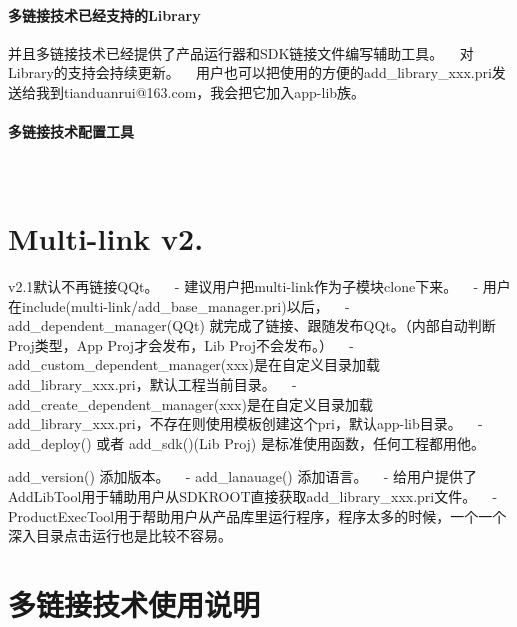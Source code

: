 \paragraph*{多链接技术已经支持的\+Library}

并且多链接技术已经提供了产品运行器和\+S\+D\+K链接文件编写辅助工具。 ~\newline
对\+Library的支持会持续更新。 ~\newline
用户也可以把使用的方便的add\+\_\+library\+\_\+xxx.\+pri发送给我到tianduanrui@163.\+com，我会把它加入app-\/lib族。 ~\newline
 ~\newline
 \paragraph*{多链接技术配置工具}

 ~\newline


\section*{Multi-\/link v2.}


\begin{DoxyItemize}
\item v2.\+1默认不再链接\+Q\+Qt。 ~\newline
-\/ 建议用户把multi-\/link作为子模块clone下来。 ~\newline
-\/ 用户在include(multi-\/link/add\+\_\+base\+\_\+manager.\+pri)以后， ~\newline
 -\/ add\+\_\+dependent\+\_\+manager(\+Q\+Qt) 就完成了链接、跟随发布\+Q\+Qt。（内部自动判断\+Proj类型，\+App Proj才会发布，\+Lib Proj不会发布。） ~\newline
 -\/ add\+\_\+custom\+\_\+dependent\+\_\+manager(xxx)是在自定义目录加载add\+\_\+library\+\_\+xxx.\+pri，默认工程当前目录。 ~\newline
 -\/ add\+\_\+create\+\_\+dependent\+\_\+manager(xxx)是在自定义目录加载add\+\_\+library\+\_\+xxx.\+pri，不存在则使用模板创建这个pri，默认app-\/lib目录。 ~\newline
-\/ add\+\_\+deploy() 或者 add\+\_\+sdk()(Lib Proj) 是标准使用函数，任何工程都用他。
\item add\+\_\+version() 添加版本。 ~\newline
-\/ add\+\_\+lanauage() 添加语言。 ~\newline
-\/ 给用户提供了\+Add\+Lib\+Tool用于辅助用户从\+S\+D\+K\+R\+O\+O\+T直接获取add\+\_\+library\+\_\+xxx.\+pri文件。 ~\newline
-\/ Product\+Exec\+Tool用于帮助用户从产品库里运行程序，程序太多的时候，一个一个深入目录点击运行也是比较不容易。 ~\newline
 \section*{多链接技术使用说明}
\end{DoxyItemize}

